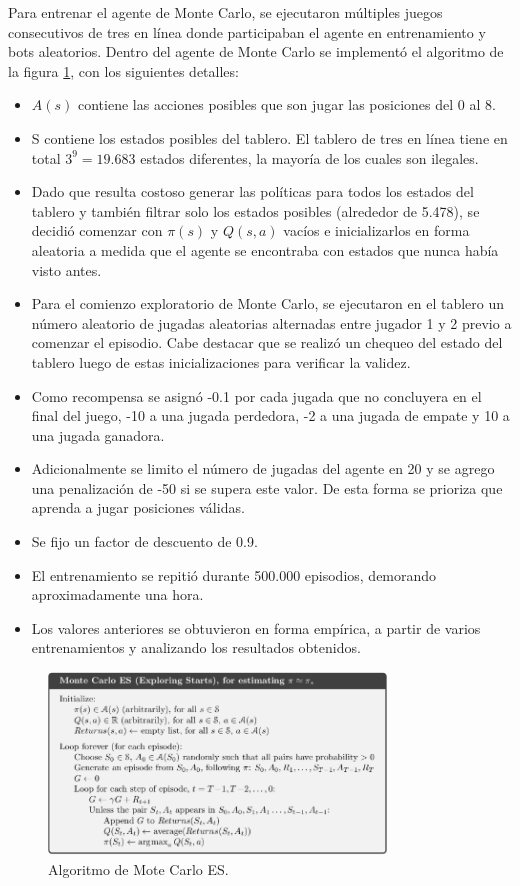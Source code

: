Para entrenar el agente de Monte Carlo, se ejecutaron múltiples juegos consecutivos de tres en línea donde participaban el agente en entrenamiento y bots aleatorios. Dentro del agente de Monte Carlo se implementó el algoritmo de la figura \ref{fig:algorithm}, con los siguientes detalles:
\begin{itemize}
    \item \(A(s)\) contiene las acciones posibles que son jugar las posiciones del 0 al 8.
    \item S contiene los estados posibles del tablero. El tablero de tres en línea tiene en total \(3^9 = 19.683\) estados diferentes, la mayoría de los cuales son ilegales.
    \item  Dado que resulta costoso generar las políticas para todos los estados del tablero y también filtrar solo los estados posibles (alrededor de 5.478), se decidió comenzar con \(\pi(s)\) y \(Q(s,a)\) vacíos e inicializarlos en forma aleatoria a medida que el agente se encontraba con estados que nunca había visto antes.
    \item Para el comienzo exploratorio de Monte Carlo, se ejecutaron en el tablero un número aleatorio de jugadas aleatorias alternadas entre jugador 1 y 2 previo a comenzar el episodio. Cabe destacar que se realizó un chequeo del estado del tablero luego de estas inicializaciones para verificar la validez.
    \item Como recompensa se asignó -0.1 por cada jugada que no concluyera en el final del juego, -10 a una jugada perdedora, -2 a una jugada de empate y 10 a una jugada ganadora.
    \item Adicionalmente se limito el número de jugadas del agente en 20 y se agrego una penalización de -50 si se supera este valor. De esta forma se prioriza que aprenda a jugar posiciones válidas.
    \item Se fijo un factor de descuento de 0.9.
    \item El entrenamiento se repitió durante 500.000 episodios, demorando aproximadamente una hora.
    \item Los valores anteriores se obtuvieron en forma empírica, a partir de varios entrenamientos y analizando los resultados obtenidos.
\end{itemize} 

\begin{figure}[htbp]
	\centering
	\includegraphics[width=0.8\textwidth]{./Figures/algorithm.png}
	\caption{Algoritmo de Mote Carlo ES.}
	\label{fig:algorithm}
\end{figure}

